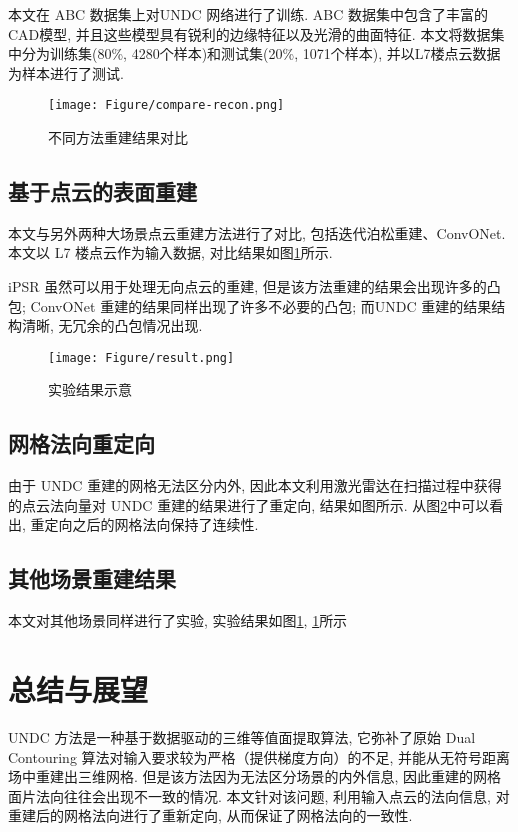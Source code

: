 本文在 ABC 数据集上对UNDC 网络进行了训练. ABC 数据集中包含了丰富的CAD模型, 并且这些模型具有锐利的边缘特征以及光滑的曲面特征. 
本文将数据集中分为训练集(80\%, 4280个样本)和测试集(20\%, 1071个样本), 并以L7楼点云数据为样本进行了测试. 

\begin{figure}[H]
	\center
	\texttt{[image: Figure/compare-recon.png]}
	\centering
	\caption{不同方法重建结果对比}\label{fig:fig-compare}
\end{figure}

\subsection{基于点云的表面重建}
本文与另外两种大场景点云重建方法进行了对比, 包括迭代泊松重建\cite{hou2022iterative}、ConvONet\cite{tang2021sa}. 本文以 L7 楼点云作为输入数据, 对比结果如图\ref{fig:fig-compare}所示. 

iPSR 虽然可以用于处理无向点云的重建, 但是该方法重建的结果会出现许多的凸包; ConvONet 重建的结果同样出现了许多不必要的凸包; 而UNDC 重建的结果结构清晰, 无冗余的凸包情况出现. 

\begin{figure}[H]
	\center
	\texttt{[image: Figure/result.png]}
	\centering
	\caption{实验结果示意}\label{fig:fig-result}
\end{figure}

\subsection{网格法向重定向} \label{reorientation}
由于 UNDC 重建的网格无法区分内外, 因此本文利用激光雷达在扫描过程中获得的点云法向量对 UNDC 重建的结果进行了重定向, 结果如图所示. 从图\ref{fig:fig-result}中可以看出, 重定向之后的网格法向保持了连续性. 

\subsection{其他场景重建结果}

本文对其他场景同样进行了实验, 实验结果如图\ref{}, \ref{}所示


\section{总结与展望}
UNDC 方法是一种基于数据驱动的三维等值面提取算法, 它弥补了原始 Dual Contouring 算法对输入要求较为严格（提供梯度方向）的不足, 并能从无符号距离场中重建出三维网格. 
但是该方法因为无法区分场景的内外信息, 因此重建的网格面片法向往往会出现不一致的情况. 
本文针对该问题, 利用输入点云的法向信息, 对重建后的网格法向进行了重新定向, 从而保证了网格法向的一致性. 

\printbibliography%
